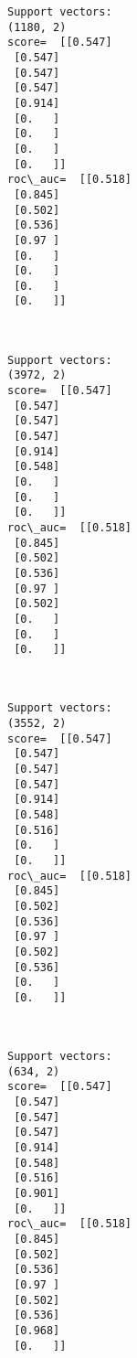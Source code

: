 \documentclass[11pt]{article}
\begin{document}
    \begin{Verbatim}[commandchars=\\\{\}]
Support vectors:
(1180, 2)
score=  [[0.547]
 [0.547]
 [0.547]
 [0.547]
 [0.914]
 [0.   ]
 [0.   ]
 [0.   ]
 [0.   ]]
roc\_auc=  [[0.518]
 [0.845]
 [0.502]
 [0.536]
 [0.97 ]
 [0.   ]
 [0.   ]
 [0.   ]
 [0.   ]]

    \end{Verbatim}

    \begin{center}
    \end{center}
    { \hspace*{\fill} \\}
    
    \begin{Verbatim}[commandchars=\\\{\}]
Support vectors:
(3972, 2)
score=  [[0.547]
 [0.547]
 [0.547]
 [0.547]
 [0.914]
 [0.548]
 [0.   ]
 [0.   ]
 [0.   ]]
roc\_auc=  [[0.518]
 [0.845]
 [0.502]
 [0.536]
 [0.97 ]
 [0.502]
 [0.   ]
 [0.   ]
 [0.   ]]

    \end{Verbatim}

    \begin{center}
    \end{center}
    { \hspace*{\fill} \\}
    
    \begin{Verbatim}[commandchars=\\\{\}]
Support vectors:
(3552, 2)
score=  [[0.547]
 [0.547]
 [0.547]
 [0.547]
 [0.914]
 [0.548]
 [0.516]
 [0.   ]
 [0.   ]]
roc\_auc=  [[0.518]
 [0.845]
 [0.502]
 [0.536]
 [0.97 ]
 [0.502]
 [0.536]
 [0.   ]
 [0.   ]]

    \end{Verbatim}

    \begin{center}
    \end{center}
    { \hspace*{\fill} \\}
    
    \begin{Verbatim}[commandchars=\\\{\}]
Support vectors:
(634, 2)
score=  [[0.547]
 [0.547]
 [0.547]
 [0.547]
 [0.914]
 [0.548]
 [0.516]
 [0.901]
 [0.   ]]
roc\_auc=  [[0.518]
 [0.845]
 [0.502]
 [0.536]
 [0.97 ]
 [0.502]
 [0.536]
 [0.968]
 [0.   ]]

    \end{Verbatim}
\end{document}
